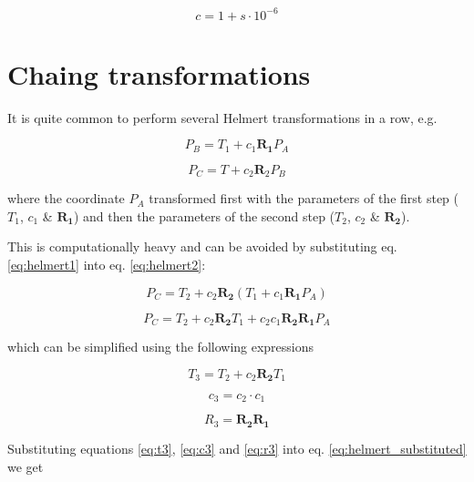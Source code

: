 \documentclass[11pt,twocolumn]{article}
\newcommand{\matr}[1]{\mathbf{#1}}
\begin{document}
\begin{equation}
    c = 1+s\cdot10^{-6}
\end{equation}

\section{Chaing transformations}

It is quite common to perform several Helmert transformations
in a row, e.g.

\begin{equation}
    \label{eq:helmert1}
    P_B = T_1 + c_1\matr{R_1}P_A
\end{equation}

\begin{equation}
    \label{eq:helmert2}
    P_C = T + c_2\matr{R}_2P_B
\end{equation}

where the coordinate $P_A$ transformed first with the parameters of the first
step ($T_1$, $c_1$ \& $\matr{R_1}$) and then the parameters of the second step
($T_2$, $c_2$ \& $\matr{R_2}$).

This is computationally heavy and can be avoided by
substituting eq. \ref{eq:helmert1} into eq. \ref{eq:helmert2}:

\begin{equation}
    P_C = T_2 + c_2\matr{R_2} \left( T_1 + c_1 \matr{R_1} P_A \right)
\end{equation}

\begin{equation}
    \label{eq:helmert_substituted}
    P_C = T_2 + c_2\matr{R_2}T_1 + c_2c_1 \matr{R_2}\matr{R_1} P_A
\end{equation}

which can be simplified using the following expressions

\begin{equation}
    \label{eq:t3}
    T_3 = T_2 + c_2\matr{R_2}T_1
\end{equation}

\begin{equation}
    \label{eq:c3}
    c_3 = c_2 \cdot c_1
\end{equation}

\begin{equation}
    \label{eq:r3}
    R_3 = \matr{R_2}\matr{R_1}
\end{equation}

Substituting equations \ref{eq:t3}, \ref{eq:c3} and \ref{eq:r3} into
eq. \ref{eq:helmert_substituted} we get
\end{document}
